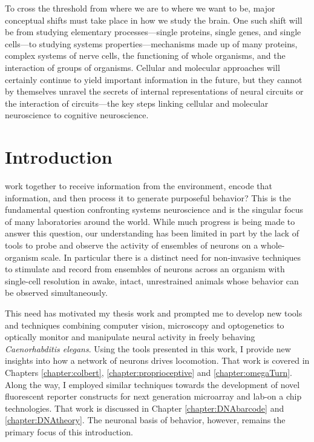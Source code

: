 \begin{savequote}[75mm] 
To cross the threshold from where we are to where we want to be, major conceptual shifts must take place in how we study the brain. One such shift will be from studying elementary processes---single proteins, single genes, and single cells---to studying systems properties---mechanisms made up of many proteins, complex systems of nerve cells, the functioning of whole organisms, and the interaction of groups of organisms. Cellular and molecular approaches will certainly continue to yield important information in the future, but they cannot by themselves unravel the secrets of internal representations of neural circuits or the interaction of circuits---the key steps linking cellular and molecular neuroscience to cognitive neuroscience. 
\end{savequote}



\chapter{Introduction}

 work together to receive information from the environment, encode that information, and then process it to generate  purposeful behavior?  This is the fundamental question  confronting systems neuroscience and is the singular focus of many laboratories around the world. While much progress is being made to answer this question, our understanding has been limited in part by the lack of tools to probe and observe the activity of ensembles of neurons on a whole-organism scale. In particular there is a distinct need for non-invasive techniques to stimulate and record from ensembles of neurons across an organism with single-cell resolution in awake, intact, unrestrained animals whose behavior can be observed simultaneously.

This need has motivated my thesis work and prompted me to develop new tools and techniques combining computer vision, microscopy and optogenetics to optically monitor and manipulate neural activity in freely behaving \emph{Caenorhabditis elegans}. Using the tools presented in this work, I provide new insights into how a network of neurons drives locomotion. That work is covered in Chapters \ref{chapter:colbert}, \ref{chapter:proprioceptive} and  \ref{chapter:omegaTurn}. Along the way, I employed similar techniques  towards the development of  novel fluorescent reporter constructs for next generation microarray and lab-on a chip technologies. That work is discussed in Chapter \ref{chapter:DNAbarcode} and \ref{chapter:DNAtheory}. The neuronal basis of behavior, however, remains the primary focus of this introduction.


